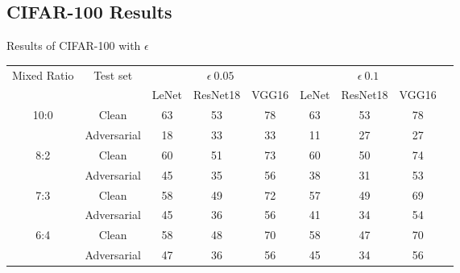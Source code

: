 \documentclass[journal,article,submit,moreauthors,pdftex]{Definitions/mdpi}
\begin{document}
\subsection{CIFAR-100 Results}

\begin{specialtable}[H]
    \centering
    \caption{Results of CIFAR-100 with \begin{math}\epsilon\end{math}}
    \label{tab2}
    \begin{tabular}{|c|c|c|c|c|c|c|c|c|}
    \hline
    \multirow{2}{*}{Mixed Ratio} & \multirow{2}{*}{Test set} & \multicolumn{3}{c|}{\begin{math}\epsilon \ 0.05\end{math}}& \multicolumn{3}{c|}{\begin{math}\epsilon \ 0.1\end{math}}       \\ \cline{3-8}
                                 &                           & LeNet               & ResNet18              & VGG16       & LeNet              & ResNet18              & VGG16              \\ \hline 
    \multirow{2}{*}{10:0}        & Clean                     & 63                  & 53                    & 78          & 63                 & 53                    & 78                 \\ \cline{2-8} 
                                 & Adversarial               & 18                  & 33                    & 33          & 11                 & 27                    & 27                 \\ \hline 
    \multirow{2}{*}{8:2}         & Clean                     & 60                  & 51                    & 73          & 60                 & 50                    & 74                 \\ \cline{2-8} 
                                 & Adversarial               & 45                  & 35                    & 56          & 38                 & 31                    & 53                 \\ \hline 
    \multirow{2}{*}{7:3}         & Clean                     & 58                  & 49                    & 72          & 57                 & 49                    & 69                 \\ \cline{2-8} 
                                 & Adversarial               & 45                  & 36                    & 56          & 41                 & 34                    & 54                 \\ \hline 
    \multirow{2}{*}{6:4}         & Clean                     & 58                  & 48                    & 70          & 58                 & 47                    & 70                 \\ \cline{2-8} 
                                 & Adversarial               & 47                  & 36                    & 56          & 45                 & 34                    & 56                 \\ \hline 
    \end{tabular}
\end{specialtable}
\end{document}
